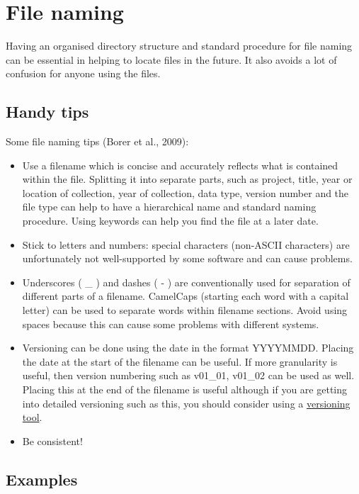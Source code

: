 \documentclass[12pt,a4paper,oneside]{report}
\providecommand{\tightlist}{%
  \setlength{\itemsep}{0pt}\setlength{\parskip}{0pt}}
\begin{document}
\hypertarget{file-naming}{%
\chapter{File naming}\label{file-naming}}

Having an organised directory structure and standard procedure for file
naming can be essential in helping to locate files in the future. It
also avoids a lot of confusion for anyone using the files.

\hypertarget{handy-tips-1}{%
\section{Handy tips}\label{handy-tips-1}}

Some file naming tips (Borer et al., 2009):

\begin{itemize}
\tightlist
\item
  Use a filename which is concise and accurately reflects what is
  contained within the file. Splitting it into separate parts, such as
  project, title, year or location of collection, year of collection,
  data type, version number and the file type can help to have a
  hierarchical name and standard naming procedure. Using keywords can
  help you find the file at a later date.
\item
  Stick to letters and numbers: special characters (non-ASCII
  characters) are unfortunately not well-supported by some software and
  can cause problems.
\item
  Underscores ( \_ ) and dashes ( - ) are conventionally used for
  separation of different parts of a filename. CamelCaps (starting each
  word with a capital letter) can be used to separate words within
  filename sections. Avoid using spaces because this can cause some
  problems with different systems.
\item
  Versioning can be done using the date in the format YYYYMMDD. Placing
  the date at the start of the filename can be useful. If more
  granularity is useful, then version numbering such as v01\_01, v01\_02
  can be used as well. Placing this at the end of the filename is useful
  although if you are getting into detailed versioning such as this, you
  should consider using a
  \protect\hyperlink{working-on-your-data}{versioning tool}.
\item
  Be consistent!
\end{itemize}

\hypertarget{examples}{%
\section{Examples}\label{examples}}
\end{document}
